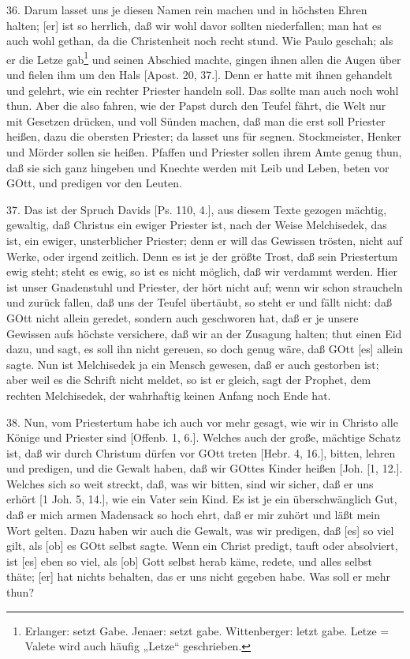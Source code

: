 36. Darum lasset uns je diesen Namen rein machen und in höchsten Ehren halten; [er] ist so herrlich, daß wir wohl davor sollten niederfallen; man hat es auch wohl gethan, da die Christenheit noch recht stund. Wie Paulo geschah; als er die Letze gab\footnote{Erlanger: setzt Gabe. Jenaer: setzt gabe. Wittenberger: letzt gabe. Letze = Valete wird auch häufig „Letze“ geschrieben.} und seinen Abschied machte, gingen ihnen allen die Augen über und fielen ihm um den Hals [Apost. 20, 37.]. Denn er hatte mit ihnen gehandelt und gelehrt, wie ein rechter Priester handeln soll. Das sollte man auch noch wohl thun. Aber die also fahren, wie der Papst durch den Teufel fährt, die Welt nur mit Gesetzen drücken, und voll Sünden machen, daß man die erst soll Priester heißen, dazu die obersten Priester; da lasset uns für segnen. Stockmeister, Henker und Mörder sollen sie heißen. Pfaffen und Priester sollen ihrem Amte genug thun, daß sie sich ganz hingeben und Knechte werden mit Leib und Leben, beten vor GOtt, und predigen vor den Leuten.

37. Das ist der Spruch Davids [Ps. 110, 4.], aus diesem Texte gezogen mächtig, gewaltig, daß Christus ein ewiger Priester ist, nach der Weise Melchisedek, das ist, ein ewiger, unsterblicher Priester; denn er will das Gewissen trösten, nicht auf Werke, oder irgend zeitlich. Denn es ist je der größte Trost, daß sein Priestertum ewig steht; steht es ewig, so ist es nicht möglich, daß wir verdammt werden. Hier ist unser Gnadenstuhl und Priester, der hört nicht auf; wenn wir schon straucheln und zurück fallen, daß uns der Teufel übertäubt, so steht er und fällt nicht: daß GOtt nicht allein geredet, sondern auch geschworen hat, daß er je unsere Gewissen aufs höchste versichere, daß wir an der Zusagung halten; thut einen Eid dazu, und sagt, es soll ihn nicht gereuen, so doch genug wäre, daß GOtt [es] allein sagte. Nun ist Melchisedek ja ein Mensch gewesen, daß er auch gestorben ist; aber weil es die Schrift nicht meldet, so ist er gleich, sagt der Prophet, dem rechten Melchisedek, der wahrhaftig keinen Anfang noch Ende hat.

38. Nun, vom Priestertum habe ich auch vor mehr gesagt, wie wir in Christo alle Könige und Priester sind [Offenb. 1, 6.]. Welches auch der große, mächtige Schatz ist, daß wir durch Christum dürfen vor GOtt treten [Hebr. 4, 16.], bitten, lehren und predigen, und die Gewalt haben, daß wir GOttes Kinder heißen [Joh.
[1, 12.]. Welches sich so weit streckt, daß, was wir bitten, sind wir sicher, daß er uns erhört [1 Joh. 5, 14.], wie ein Vater sein Kind. Es ist je ein überschwänglich Gut, daß er mich armen Madensack so hoch ehrt, daß er mir zuhört und läßt mein Wort gelten. Dazu haben wir auch die Gewalt, was wir predigen, daß [es] so viel gilt, als [ob] es GOtt selbst sagte. Wenn ein Christ predigt, tauft oder absolviert, ist [es] eben so viel, als [ob] Gott selbst herab käme, redete, und alles selbst thäte; [er] hat nichts behalten, das er uns nicht gegeben habe. Was soll er mehr thun?

